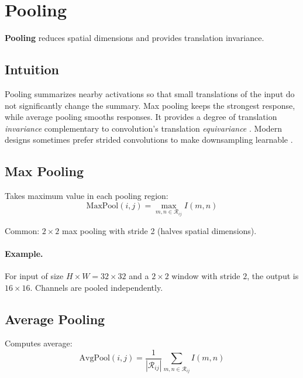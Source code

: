 
\section{Pooling}
\label{sec:pooling}


\textbf{Pooling} reduces spatial dimensions and provides translation invariance.

\subsection*{Intuition}
Pooling summarizes nearby activations so that small translations of the input do not significantly change the summary. Max pooling keeps the strongest response, while average pooling smooths responses. It provides a degree of translation \emph{invariance} complementary to convolution's translation \emph{equivariance} . Modern designs sometimes prefer strided convolutions to make downsampling learnable \cite{GoodfellowEtAl2016,He2016}.

\subsection{Max Pooling}

Takes maximum value in each pooling region:
\begin{equation}
\text{MaxPool}(i,j) = \max_{m,n \in \mathcal{R}_{ij}} I(m,n)
\end{equation}

Common: $2 \times 2$ max pooling with stride 2 (halves spatial dimensions).

\paragraph{Example.} For input of size $H\times W=32\times32$ and a $2\times2$ window with stride $2$, the output is $16\times16$. Channels are pooled independently.

\subsection{Average Pooling}

Computes average:
\begin{equation}
\text{AvgPool}(i,j) = \frac{1}{|\mathcal{R}_{ij}|} \sum_{m,n \in \mathcal{R}_{ij}} I(m,n)
\end{equation}

